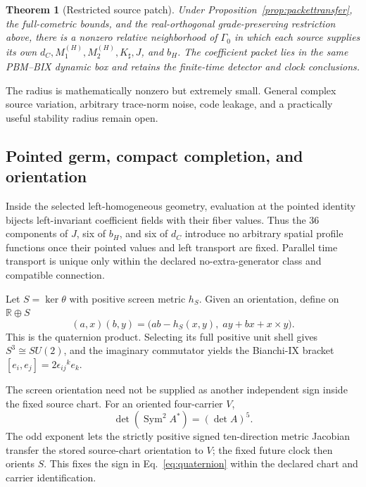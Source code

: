 \documentclass[11pt]{article}
\newtheorem{theorem}{Theorem}[section]
\theoremstyle{definition}
\theoremstyle{remark}
\newcommand{\Ker}{\operatorname{ker}}
\begin{document}
\begin{theorem}[Restricted source patch]\label{thm:sourcepatch}
Under Proposition~\ref{prop:packettransfer}, the full-cometric bounds, and the real-orthogonal grade-preserving restriction above, there is a nonzero relative neighborhood of $\Gamma_0$ in which each source supplies its own $d_C,M_1^{(H)},M_2^{(H)},K_\sharp,J$, and $b_H$. The coefficient packet lies in the same PBM--BIX dynamic box and retains the finite-time detector and clock conclusions.
\end{theorem}

The radius is mathematically nonzero but extremely small. General complex source variation, arbitrary trace-norm noise, code leakage, and a practically useful stability radius remain open.

\subsection{Pointed germ, compact completion, and orientation}

Inside the selected left-homogeneous geometry, evaluation at the pointed identity bijects left-invariant coefficient fields with their fiber values. Thus the 36 components of $J$, six of $b_H$, and six of $d_C$ introduce no arbitrary spatial profile functions once their pointed values and left transport are fixed. Parallel time transport is unique only within the declared no-extra-generator class and compatible connection.

Let $S=\Ker\theta$ with positive screen metric $h_S$. Given an orientation, define on $\mathbb R\oplus S$
\begin{equation}\label{eq:quaternion}
 (a,x)(b,y)=\bigl(ab-h_S(x,y),\;ay+bx+x\times y\bigr).
\end{equation}
This is the quaternion product. Selecting its full positive unit shell gives $S^3\cong SU(2)$, and the imaginary commutator yields the Bianchi-IX bracket $[e_i,e_j]=2\epsilon_{ij}{}^ke_k$.

The screen orientation need not be supplied as another independent sign inside the fixed source chart. For an oriented four-carrier $V$,
\begin{equation}
 \det\!\left(\operatorname{Sym}^2 A^*\right)=(\det A)^5.
\end{equation}
The odd exponent lets the strictly positive signed ten-direction metric Jacobian transfer the stored source-chart orientation to $V$; the fixed future clock then orients $S$. This fixes the sign in Eq.~\eqref{eq:quaternion} within the declared chart and carrier identification.
\end{document}
